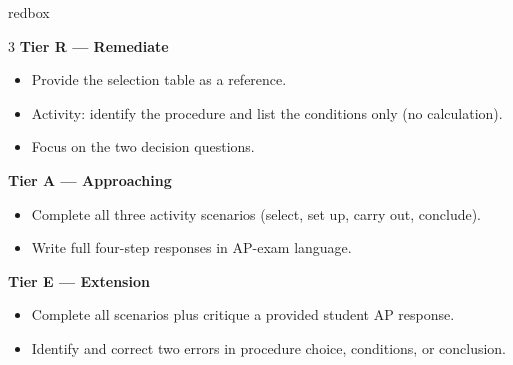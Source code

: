 \documentclass[10pt]{article}
\begin{document}
\begin{skillbox}{redbox}
\begin{multicols}{3}
    \textbf{Tier R --- Remediate}
    \begin{itemize}
        \item Provide the selection table as a reference.
        \item Activity: identify the procedure and list the conditions only (no calculation).
        \item Focus on the two decision questions.
    \end{itemize}
    \columnbreak
    \textbf{Tier A --- Approaching}
    \begin{itemize}
        \item Complete all three activity scenarios (select, set up, carry out, conclude).
        \item Write full four-step responses in AP-exam language.
    \end{itemize}
    \columnbreak
    \textbf{Tier E --- Extension}
    \begin{itemize}
        \item Complete all scenarios plus critique a provided student AP response.
        \item Identify and correct two errors in procedure choice, conditions, or conclusion.
    \end{itemize}
\end{multicols}
\end{skillbox}
\end{document}
